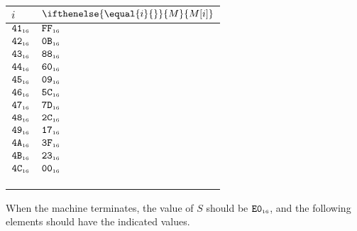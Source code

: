 \documentclass[a4paper,12pt]{article}
\makeatletter
\newcommand{\num}[1]{\texttt{#1}}
\newcommand{\hex}[1]{\num{#1}_{\textup{\tiny 16}}}
\newcommand{\MEM}[1]{\ifthenelse{\equal{#1}{}}{M}{M[#1]}}
\newcommand{\SP}{S}
\newenvironment{memtable}{%
  \begin{trivlist}
    \item
    }{%
    \end{trivlist}}
\newenvironment{memcolumn}{%
  \begin{tabular}{@{}ll@{}}
    $i$ & $\MEM{i}$ \\
    \hline}
    {%
  \end{tabular}}
\makeatother
\begin{document}
\begin{memtable}
\begin{memcolumn}
    $\hex{41}$ & $\hex{FF}$ \\
    $\hex{42}$ & $\hex{0B}$ \\
    $\hex{43}$ & $\hex{88}$ \\
    $\hex{44}$ & $\hex{60}$ \\
    $\hex{45}$ & $\hex{09}$ \\
    $\hex{46}$ & $\hex{5C}$ \\
    $\hex{47}$ & $\hex{7D}$ \\
    $\hex{48}$ & $\hex{2C}$ \\
    $\hex{49}$ & $\hex{17}$ \\
    $\hex{4A}$ & $\hex{3F}$ \\
    $\hex{4B}$ & $\hex{23}$ \\
    $\hex{4C}$ & $\hex{00}$ \\
    \\
    \\
    \\
  \end{memcolumn}
\end{memtable}
When the machine terminates, the value of $\SP$ should be $\hex{E0}$, and the following elements should have the indicated values.
\end{document}
